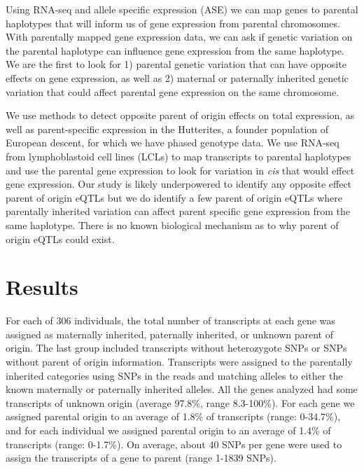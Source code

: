 Using RNA-seq and allele specific expression (ASE) we can map genes to parental haplotypes that will inform us of gene expression from parental chromosomes. With parentally mapped gene expression data, we can ask if genetic variation on the parental haplotype can influence gene expression from the same haplotype.  We are the first to look for 1) parental genetic variation that can have opposite effects on gene expression, as well as 2) maternal or paternally inherited genetic variation that could affect parental gene expression on the same chromosome. 	

We use methods to detect opposite parent of origin effects on total expression, as well as parent-specific expression in the Hutterites, a founder population of European descent, for which we have phased genotype data\cite{Livne2015}. We use RNA-seq from lymphoblastoid cell lines (LCLs) to map transcripts to parental haplotypes and use the parental gene expression to look for variation in \emph{cis} that would effect gene expression. Our study is likely underpowered to identify any opposite effect parent of origin eQTLs but we do identify a few parent of origin eQTLs where parentally inherited variation can affect parent specific gene expression from the same haplotype. There is no known biological mechanism as to why parent of origin eQTLs could exist. 

\section{Results}\label{ch04-results}

For each of 306 individuals, the total number of transcripts at each gene was assigned as maternally inherited, paternally inherited, or unknown parent of origin. The last group included transcripts without heterozygote SNPs or SNPs without parent of origin information. Transcripts were assigned to the parentally inherited categories using SNPs in the reads and matching alleles to either the known maternally or paternally inherited alleles. All the genes analyzed had some transcripts of unknown origin (average 97.8\%, range 8.3-100\%). For each gene we assigned parental origin to an average of 1.8\% of transcripts (range: 0-34.7\%), and for each individual we assigned parental origin to an average of 1.4\% of transcripts (range: 0-1.7\%). On average, about 40 SNPs per gene were used to assign the transcripts of a gene to parent (range 1-1839 SNPs). 


